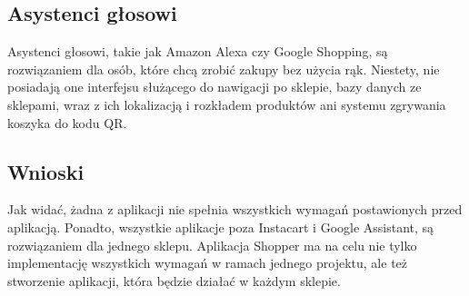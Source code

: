 \subsection{Asystenci głosowi}

Asystenci głosowi, takie jak Amazon Alexa czy Google Shopping, są rozwiązaniem dla osób, które chcą zrobić zakupy bez użycia rąk. Niestety, nie posiadają one interfejsu służącego do nawigacji po sklepie, bazy danych ze sklepami, wraz z ich lokalizacją i rozkładem produktów ani systemu zgrywania koszyka do kodu QR.

\subsection{Wnioski}
Jak widać, żadna z aplikacji nie spełnia wszystkich wymagań postawionych przed aplikacją. Ponadto, wszystkie aplikacje poza Instacart i Google Assistant, są rozwiązaniem dla jednego sklepu. Aplikacja Shopper ma na celu nie tylko implementację wszystkich wymagań w ramach jednego projektu, ale też stworzenie aplikacji, która będzie działać w każdym sklepie.
